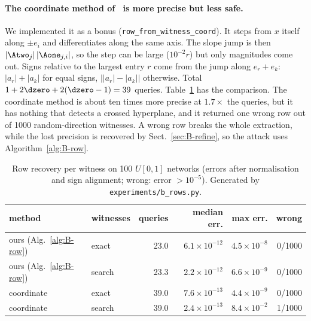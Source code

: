 \paragraph{The coordinate method of~\cite[\S5.2]{DBLP:conf/crypto/CarliniJM20} is more precise but less safe.}
We implemented it as a bonus (\texttt{row\_from\_witness\_coord}). It steps
from $x$ itself along $\pm e_i$ and differentiates along the same axis. The
slope jump is then $|\Atwo_j|\,|\Aone_{j,i}|$, so the step can be large
($10^{-2}r$) but only magnitudes come out. Signs relative to the largest entry
$r$ come from the jump along $e_r+e_k$: $|a_r|+|a_k|$ for equal signs,
$\bigl||a_r|-|a_k|\bigr|$ otherwise. Total $1+2\dzero+2(\dzero-1)=39$ queries.
Table~\ref{tab:B-rowmethods} has the comparison. The coordinate method is
about ten times more precise at $1.7\times$ the queries, but it has nothing
that detects a crossed hyperplane, and it returned one wrong row out of 1000
random-direction witnesses. A wrong row breaks the whole extraction, while
the lost precision is recovered by Sect.~\ref{sec:B-refine}, so the attack
uses Algorithm~\ref{alg:B-row}.

\begin{table}[t]
\centering
\caption{Row recovery per witness on 100 $U[0,1]$ networks (errors after
normalisation and sign alignment; wrong: error $>10^{-5}$). Generated by
\texttt{experiments/b\_rows.py}.}
\label{tab:B-rowmethods}
\setlength{\tabcolsep}{4pt}
\begin{tabular}{llrrrr}
\toprule
method & witnesses & queries & median err. & max err. & wrong\\
\midrule
ours (Alg.~\ref{alg:B-row}) & exact & 23.0 & $6.1\times10^{-12}$ & $4.5\times10^{-8}$ & 0/1000\\
ours (Alg.~\ref{alg:B-row}) & search & 23.3 & $2.2\times10^{-12}$ & $6.6\times10^{-9}$ & 0/1000\\
coordinate~\cite[\S5.2]{DBLP:conf/crypto/CarliniJM20} & exact & 39.0 & $7.6\times10^{-13}$ & $4.4\times10^{-9}$ & 0/1000\\
coordinate~\cite[\S5.2]{DBLP:conf/crypto/CarliniJM20} & search & 39.0 & $2.4\times10^{-13}$ & $8.4\times10^{-2}$ & 1/1000\\
\bottomrule
\end{tabular}
\end{table}

